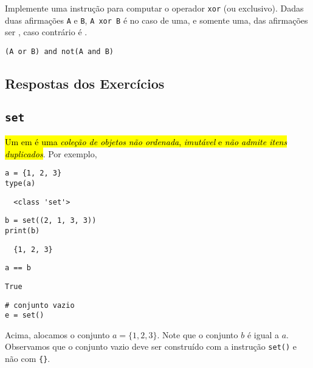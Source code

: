 \begin{exer}
  Implemente uma instrução para computar o operador \texttt{xor} (ou exclusivo). Dadas duas afirmações \texttt{A} e \texttt{B}, \texttt{A xor B} é {\PYTHONTrue} no caso de uma, e somente uma, das afirmações ser {\PYTHONFalse}, caso contrário é {\PYTHONFalse}.
\end{exer}
\begin{resp}
\texttt{(A or B) and not(A and B)}
\end{resp}

\ifisbook 
\subsection*{Respostas dos Exercícios}
\shipoutAnswer
\fi


\subsection{\texttt{set}}

\hl{Um {\PYTHONset} em {\python} é uma \emph{coleção de objetos} \emph{não ordenada}, \emph{imutável} e \emph{não admite itens duplicados}}. Por exemplo,

\begin{lstlisting}
a = {1, 2, 3}
type(a)  
\end{lstlisting}

\begin{verbatim}
  <class 'set'>
\end{verbatim}

\begin{lstlisting}
b = set((2, 1, 3, 3))
print(b)
\end{lstlisting}

\begin{verbatim}
  {1, 2, 3}
\end{verbatim}

\begin{lstlisting}
a == b
\end{lstlisting}

\begin{verbatim}
True
\end{verbatim}

\begin{lstlisting}
# conjunto vazio
e = set()  
\end{lstlisting}

Acima, alocamos o conjunto $a = \{1,2, 3\}$. Note que o conjunto $b$ é igual a $a$. Observamos que o conjunto vazio deve ser construído com a instrução \texttt{set()} e não com \texttt{\{\}}.

